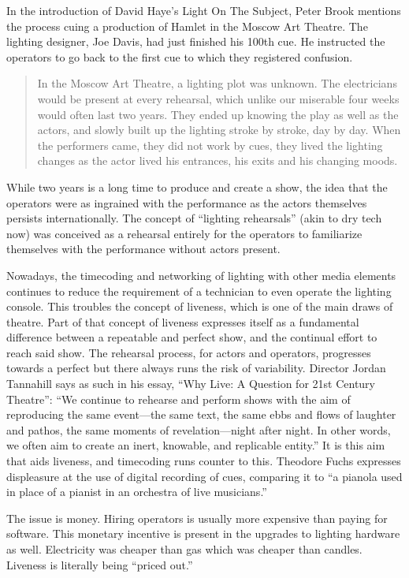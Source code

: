 \documentclass[
    12pt,
    twoside,
    bibstyle=chicago,
    headerstyle=uppercase,
	bibfile=thesis_updating.bib
]{reedthesis}
\begin{document}
In the introduction of David Haye's Light On The Subject, Peter Brook mentions the process cuing a production of Hamlet in the Moscow Art Theatre. The lighting designer, Joe Davis, had just finished his 100th cue. He instructed the operators to go back to the first cue to which they registered confusion.

\begin{quote}
In the Moscow Art Theatre, a lighting plot was unknown. The electricians would be present at every rehearsal, which unlike our miserable four weeks would often last two years. They ended up knowing the play as well as the actors, and slowly built up the lighting stroke by stroke, day by day. When the performers came, they did not work by cues, they lived the lighting changes as the actor lived his entrances, his exits and his changing moods.
\end{quote}

While two years is a long time to produce and create a show, the idea that the operators were as ingrained with the performance as the actors themselves persists internationally. The concept of “lighting rehearsals” (akin to dry tech now) was conceived as a rehearsal entirely for the operators to familiarize themselves with the performance without actors present.

Nowadays, the timecoding and networking of lighting with other media elements continues to reduce the requirement of a technician to even operate the lighting console. This troubles the concept of liveness, which is one of the main draws of theatre. Part of that concept of liveness expresses itself as a fundamental difference between a repeatable and perfect show, and the continual effort to reach said show. The rehearsal process, for actors and operators, progresses towards a perfect but there always runs the risk of variability. Director Jordan Tannahill says as such in his essay, “Why Live: A Question for 21st Century Theatre”: “We continue to rehearse and perform shows with the aim of reproducing the same event---the same text, the same ebbs and flows of laughter and pathos, the same moments of revelation---night after night. In other words, we often aim to create an inert, knowable, and replicable entity.” It is this aim that aids liveness, and timecoding runs counter to this. Theodore Fuchs expresses displeasure at the use of digital recording of cues, comparing it to “a pianola used in place of a pianist in an orchestra of live musicians.” 

The issue is money. Hiring operators is usually more expensive than paying for software. This monetary incentive is present in the upgrades to lighting hardware as well. Electricity was cheaper than gas which was cheaper than candles. Liveness is literally being “priced out.”
\end{document}
